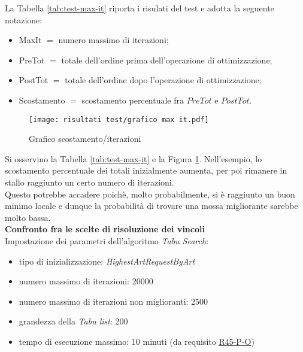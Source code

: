 \newpage
\noindent La Tabella \ref{tab:test-max-it} riporta i risulati del test e adotta la seguente notazione:
\begin{itemize}
    \item MaxIt $=$ numero massimo di iterazioni;
    \item PreTot $=$ totale dell'ordine prima dell'operazione di ottimizzazione;
    \item PostTot $=$ totale dell'ordine dopo l'operazione di ottimizzazione;
    \item Scostamento $=$ scostamento percentuale fra $PreTot$ e $PostTot$.
\end{itemize}
\begin{figure}[!h] 
    \centering
    \vspace*{0.2cm}
    \texttt{[image: risultati test/grafico max it.pdf]}
    \caption{Grafico scostamento/iterazioni}
    \label{grafico-scostamento-iterazioni}
\end{figure}
\noindent Si osservino la Tabella \ref{tab:test-max-it} e la Figura \ref{grafico-scostamento-iterazioni}.
\noindent Nell'esempio, lo scostamento percentuale dei
totali inizialmente aumenta, per poi rimanere in stallo raggiunto un certo numero di iterazioni.\\
Questo potrebbe accadere poichè, molto probabilmente, si è raggiunto un buon minimo locale e dunque la probabilità
di trovare una mossa migliorante sarebbe molto bassa.\\[0.2cm]
\textbf{Confronto fra le scelte di risoluzione dei vincoli}\hfill\\[0.1cm]
Impostazione dei parametri dell'algoritmo \textit{Tabu Search}:
\begin{itemize}
    \item tipo di inizializzazione: \textit{HighestArtRequestByArt}
    \item numero massimo di iterazioni: 20000
    \item numero massimo di iterazioni non miglioranti: 2500
    \item grandezza della \textit{Tabu list}: 200
    \item tempo di esecuzione massimo: 10 minuti (da requisito \hyperref[tab:requisiti-di-performance]{R45-P-O})
\end{itemize}

